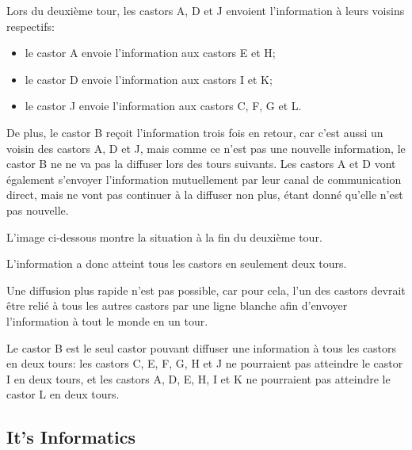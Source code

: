 \documentclass[a4paper,11pt]{report}
\newcommand{\taskGraphicsFolder}{..}
\begin{document}
{\centering%
\par}

Lors du deuxième tour, les castors A, D et J envoient l’information à leurs voisins respectifs:

\begin{itemize}
  \item le castor A envoie l’information aux castors E et H;
  \item le castor D envoie l’information aux castors I et K;
  \item le castor J envoie l’information aux castors C, F, G et L.
\end{itemize}

De plus, le castor B reçoit l’information trois fois en retour, car c’est aussi un voisin des castors A, D et J, mais comme ce n’est pas une nouvelle information, le castor B ne ne va pas la diffuser lors des tours suivants. Les castors A et D vont également s’envoyer l’information mutuellement par leur canal de communication direct, mais ne vont pas continuer à la diffuser non plus, étant donné qu’elle n’est pas nouvelle.

\begin{samepage}
L’image ci-dessous montre la situation à la fin du deuxième tour.

\nopagebreak

{\centering%
\par}
\end{samepage}

L’information a donc atteint tous les castors en seulement deux tours.

Une diffusion plus rapide n’est pas possible, car pour cela, l’un des castors devrait être relié à tous les autres castors par une ligne blanche afin d’envoyer l’information à tout le monde en un tour.

Le castor B est le seul castor pouvant diffuser une information à tous les castors en deux tours: les castors C, E, F, G, H et J ne pourraient pas atteindre le castor I en deux tours, et les castors A, D, E, H, I et K ne pourraient pas atteindre le castor L en deux tours.


\subsection*{It’s Informatics}
\end{document}
